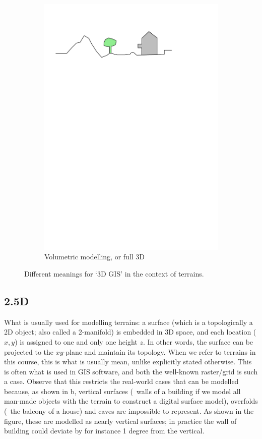 \begin{figure}[b]
\begin{subfigure}[b]{0.45\linewidth}
    \includegraphics[page=4,width=\linewidth]{figs/dimgis}
    \caption{Volumetric modelling, or full 3D}\label{fig:dimgis:3}
  \end{subfigure}%
  \caption{Different meanings for `3D GIS' in the context of terrains.}
\label{fig:dimgis}
\end{figure}

\subsection{2.5D} 
What is usually used for modelling terrains: a surface (which is a topologically a 2D object; also called a 2-manifold) is embedded in 3D space, and each location ($x,y$) is assigned to one and only one height $z$.
In other words, the surface can be projected to the $xy$-plane and maintain its topology.
When we refer to terrains in this course, this is what is usually mean, unlike explicitly stated otherwise.
This is often what is used in GIS software, and both the well-known raster/grid  is such a case.
Observe that this restricts the real-world cases that can be modelled because, as shown in b, vertical surfaces (\eg\ walls of a building if we model all man-made objects with the terrain to construct a digital surface model), overfolds (\eg\ the balcony of a house) and caves are impossible to represent.
As shown in the figure, these are modelled as nearly vertical surfaces; in practice the wall of building could deviate by for instance 1 degree from the vertical. 

